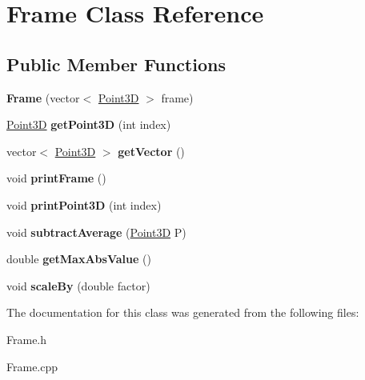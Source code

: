 \hypertarget{classFrame}{}\section{Frame Class Reference}
\label{classFrame}
\subsection*{Public Member Functions}
\begin{DoxyCompactItemize}
\item 
\hypertarget{classFrame_ae252f660b1c8296bac0137a79afcd012}{}{\bfseries Frame} (vector$<$ \hyperlink{classPoint3D}{Point3\+D} $>$ frame)\label{classFrame_ae252f660b1c8296bac0137a79afcd012}

\item 
\hypertarget{classFrame_a1d521a784908cc6741ce89753947b493}{}\hyperlink{classPoint3D}{Point3\+D} {\bfseries get\+Point3\+D} (int index)\label{classFrame_a1d521a784908cc6741ce89753947b493}

\item 
\hypertarget{classFrame_ac2058e04df76c9ce11799a2429f5ea62}{}vector$<$ \hyperlink{classPoint3D}{Point3\+D} $>$ {\bfseries get\+Vector} ()\label{classFrame_ac2058e04df76c9ce11799a2429f5ea62}

\item 
\hypertarget{classFrame_a95baa9fc31d40ccf55bfb3d7560eb712}{}void {\bfseries print\+Frame} ()\label{classFrame_a95baa9fc31d40ccf55bfb3d7560eb712}

\item 
\hypertarget{classFrame_a6988228a49ab66838d2528baea014cc3}{}void {\bfseries print\+Point3\+D} (int index)\label{classFrame_a6988228a49ab66838d2528baea014cc3}

\item 
\hypertarget{classFrame_a5e97ae068939308c971b03376978393f}{}void {\bfseries subtract\+Average} (\hyperlink{classPoint3D}{Point3\+D} P)\label{classFrame_a5e97ae068939308c971b03376978393f}

\item 
\hypertarget{classFrame_adbb56598e45bb3499d38fc95a45f24e8}{}double {\bfseries get\+Max\+Abs\+Value} ()\label{classFrame_adbb56598e45bb3499d38fc95a45f24e8}

\item 
\hypertarget{classFrame_a630d673f2b2946e9d40ee9a584a93823}{}void {\bfseries scale\+By} (double factor)\label{classFrame_a630d673f2b2946e9d40ee9a584a93823}

\end{DoxyCompactItemize}


The documentation for this class was generated from the following files\+:\begin{DoxyCompactItemize}
\item 
Frame.\+h\item 
Frame.\+cpp\end{DoxyCompactItemize}
